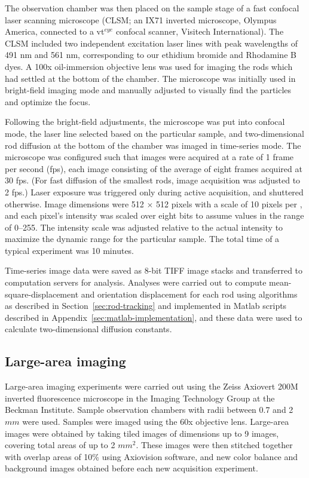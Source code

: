 The observation chamber was then placed on the sample stage of a fast confocal laser scanning microscope (CLSM; 
an IX71 inverted microscope, Olympus America, connected to a vt$^{eye}$ confocal scanner, Visitech International). The CLSM
included two independent excitation laser lines with peak wavelengths of 491 nm and 561 nm, corresponding to our ethidium 
bromide and Rhodamine B dyes.  A 100x oil-immersion objective lens was used for imaging the rods which had settled at the bottom
of the chamber.  The microscope was initially used in bright-field imaging mode and manually adjusted to 
visually find the particles and 
optimize the focus.

Following the bright-field adjustments, the microscope was put into confocal mode, the laser line selected 
based on the particular sample, and two-dimensional rod diffusion at the 
bottom of the chamber was imaged in time-series mode.  The microscope was configured such that images were acquired at
a rate of 1 frame per second (fps), 
each image consisting of the average of eight frames acquired at 30 fps.  
(For fast diffusion of the smallest rods,
image acquisition was adjusted to 2 fps.)  Laser exposure was triggered only during active 
acquisition, and shuttered otherwise.  Image dimensions were 512 $\times$ 512 pixels with a scale of 10 pixels
per \microns, and each pixel's intensity was scaled over eight bits to assume values in the range of 0--255.
The intensity scale was adjusted relative to the actual intensity to maximize the dynamic range for the particular sample.
The total time of a typical experiment was 10 minutes.

Time-series image data were saved as 8-bit TIFF image stacks and transferred to computation servers for analysis.
Analyses were carried out to compute mean-square-displacement and orientation displacement for each rod using algorithms as 
described in Section~\ref{sec:rod-tracking} and implemented in Matlab scripts described in 
Appendix~\ref{sec:matlab-implementation}, 
and these data
were used to calculate two-dimensional diffusion constants.  

\subsection{Large-area imaging}
\label{sec:tiled-microscopy}

Large-area imaging experiments were carried out using the 
Zeiss Axiovert 200M inverted fluorescence microscope in the Imaging Technology Group
at the Beckman Institute.  Sample observation chambers with radii between 0.7 and 2 $mm$ were used.
Samples were imaged using the 60x objective lens.  Large-area images were obtained by taking tiled images of dimensions 
up to 9  images, covering total areas of up to 2 $mm^2$.  These images were then stitched together with overlap 
areas of 10\% using Axiovision 
software, and new color balance and background images obtained before each new acquisition experiment.

